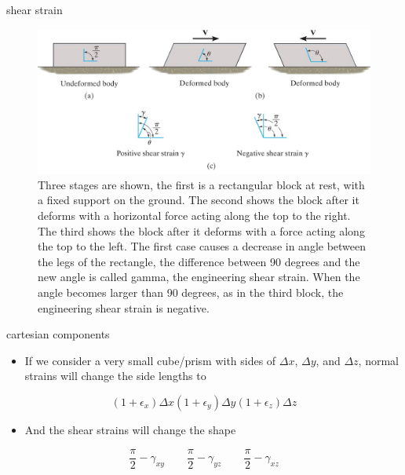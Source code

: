 \documentclass[
  letterpaper,
  ignorenonframetext,
  aspectratio=43,
  handout,
  12pt]{beamer}
\providecommand{\tightlist}{%
  \setlength{\itemsep}{0pt}\setlength{\parskip}{0pt}}
\providecommand{\tightlist}{%
\setlength{\itemsep}{0pt}\setlength{\parskip}{0pt}}
\let\Oldincludegraphics\includegraphics
\renewcommand{\includegraphics}[2][]{\Oldincludegraphics[width=\textwidth,height=0.7\textheight,keepaspectratio]{#2}}
\begin{document}
\begin{frame}{shear strain}
\protect\hypertarget{shear-strain-1}{}
\begin{figure}
\centering
\includegraphics{../images/shear-strain.jpg}
\caption{Three stages are shown, the first is a rectangular block at
rest, with a fixed support on the ground. The second shows the block
after it deforms with a horizontal force acting along the top to the
right. The third shows the block after it deforms with a force acting
along the top to the left. The first case causes a decrease in angle
between the legs of the rectangle, the difference between 90 degrees and
the new angle is called gamma, the engineering shear strain. When the
angle becomes larger than 90 degrees, as in the third block, the
engineering shear strain is negative.}
\end{figure}
\end{frame}

\begin{frame}{cartesian components}
\protect\hypertarget{cartesian-components}{}
\begin{itemize}
\tightlist
\item
  If we consider a very small cube/prism with sides of \(\Delta x\),
  \(\Delta y\), and \(\Delta z\), normal strains will change the side
  lengths to
\end{itemize}

\[(1+\epsilon_x)\Delta x (1 + \epsilon_y)\Delta y (1 + \epsilon_z)\Delta z\]

\begin{itemize}
\tightlist
\item
  And the shear strains will change the shape
\end{itemize}

\[\frac{\pi}{2}-\gamma_{xy} \qquad \frac{\pi}{2}-\gamma_{yz} \qquad \frac{\pi}{2}-\gamma_{xz}\]
\end{frame}
\end{document}
